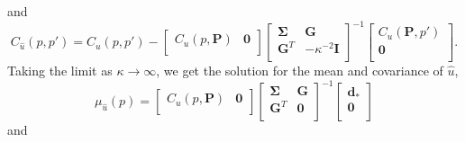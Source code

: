 and
\begin{equation}\label{ch5:eq:PosteriorCov2}
C_{\hat{u}}(p,p') = C_u(p,p') - 
                    \left[\begin{array}{cc}
                          C_u(p,\mathbf{P}) & \mathbf{0} \\
                          \end{array}\right]
                    \left[\begin{array}{cc}
                          \mathbf{\Sigma} & \mathbf{G} \\
                          \mathbf{G}^T  & -\kappa^{-2} \mathbf{I} \\
                          \end{array}\right]^{-1}
                    \left[\begin{array}{c}
                          C_u(\mathbf{P},p') \\
                          \mathbf{0} \\
                          \end{array}\right].
\end{equation}
Taking the limit as $\kappa \to \infty$, we get the solution for the mean and covariance of $\hat{u}$,
 \begin{equation}\label{ch5:eq:PosteriorMean3}
\mu_{\hat{u}}(p) = \left[\begin{array}{cc}
                         C_u(p,\mathbf{P}) & \mathbf{0} \\
                         \end{array}\right]
                   \left[\begin{array}{cc}
                         \mathbf{\Sigma} & \mathbf{G} \\
                         \mathbf{G}^T  & \mathbf{0} \\
                         \end{array}\right]^{-1}
                   \left[\begin{array}{c}
                         \mathbf{d}_* \\
                         \mathbf{0} \\
                         \end{array}\right]
\end{equation}    
and
